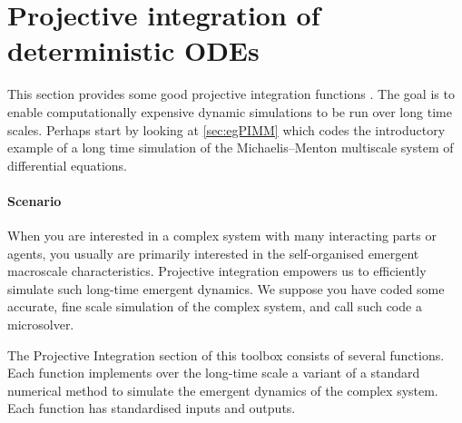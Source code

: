 \section{Projective integration of deterministic ODEs}
\label{sec:ProjInt}
\localtableofcontents

This section provides some good projective integration functions \cite[e.g.]{Gear02b, Gear03c, Givon06}.
The goal is to enable computationally expensive dynamic simulations to be run over long time scales.
Perhaps start by looking at \cref{sec:egPIMM} which codes the introductory example of a long time simulation of the Michaelis--Menton multiscale system of differential equations.

\paragraph{Scenario}
When you are interested in a complex system with many interacting parts or agents, you usually are primarily interested in the self-organised emergent macroscale characteristics.
Projective integration empowers us to efficiently simulate such long-time emergent dynamics.
We suppose you have coded some accurate, fine scale simulation of the complex system, and call such code a microsolver.

The Projective Integration section of this toolbox consists of several functions.
Each function implements over the long-time scale a variant of a standard numerical method to simulate the emergent dynamics of the complex system.
Each function has standardised inputs and outputs.

